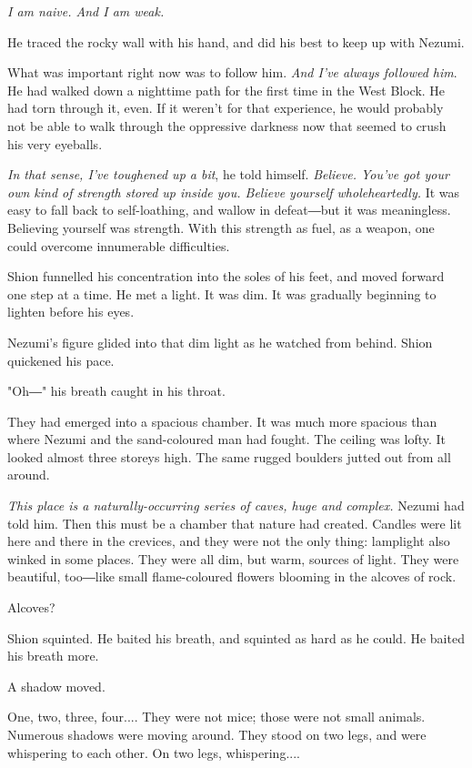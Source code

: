 \emph{I am naive. And I am weak.}

He traced the rocky wall with his hand, and did his best to keep up with
Nezumi.

What was important right now was to follow him. \emph{And I've always followed
	him}. He had walked down a nighttime path for the first time in the West
Block. He had torn through it, even. If it weren't for that experience,
he would probably not be able to walk through the oppressive darkness
now that seemed to crush his very eyeballs.

\emph{In that sense, I've toughened up a bit}, he told himself. \emph{Believe. You've
	got your own kind of strength stored up inside you. Believe yourself
	wholeheartedly.} It was easy to fall back to self-loathing, and wallow in
defeat―but it was meaningless. Believing yourself was strength. With
this strength as fuel, as a weapon, one could overcome innumerable
difficulties.

Shion funnelled his concentration into the soles of his feet, and moved
forward one step at a time. He met a light. It was dim. It was gradually
beginning to lighten before his eyes.

Nezumi's figure glided into that dim light as he watched from behind.
Shion quickened his pace.

"Oh―" his breath caught in his throat.

They had emerged into a spacious chamber. It was much more spacious than
where Nezumi and the sand-coloured man had fought. The ceiling was
lofty. It looked almost three storeys high. The same rugged boulders
jutted out from all around.

\emph{This place is a naturally-occurring series of caves, huge and complex.}
Nezumi had told him. Then this must be a chamber that nature had
created. Candles were lit here and there in the crevices, and they were
not the only thing: lamplight also winked in some places. They were all
dim, but warm, sources of light. They were beautiful, too―like small
flame-coloured flowers blooming in the alcoves of rock.

Alcoves?

Shion squinted. He baited his breath, and squinted as hard as he could.
He baited his breath more.

A shadow moved.

One, two, three, four.... They were not mice; those were not small
animals. Numerous shadows were moving around. They stood on two legs,
and were whispering to each other. On two legs, whispering....

